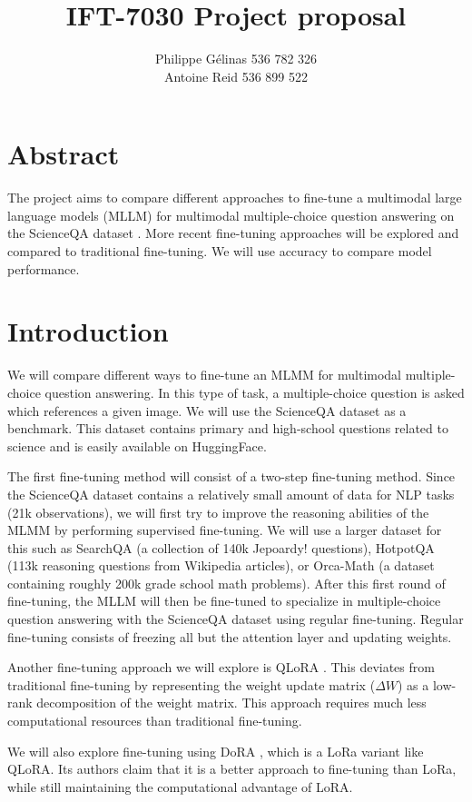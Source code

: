 \documentclass[11pt]{article} %
\title{IFT-7030 Project proposal}
\author{Philippe Gélinas 536 782 326 \\ Antoine Reid 536 899 522}
\date{\vspace{-5ex}} %
\begin{document}
\maketitle

\section*{Abstract}
The project aims to compare different approaches to fine-tune a multimodal large language models (MLLM) for multimodal multiple-choice question answering on the ScienceQA dataset \cite{ScienceQA}. More recent fine-tuning approaches will be explored and compared to traditional fine-tuning. We will use accuracy to compare model performance.

\section*{Introduction}
We will compare different ways to fine-tune an MLMM for multimodal multiple-choice question answering. In this type of task, a multiple-choice question is asked which references a given image. We will use the ScienceQA dataset as a benchmark. This dataset contains primary and high-school questions related to science and is easily available on HuggingFace.

The first fine-tuning method will consist of a two-step fine-tuning method. Since the ScienceQA dataset contains a relatively small amount of data for NLP tasks (21k observations), we will first try to improve the reasoning abilities of the MLMM by performing supervised fine-tuning. We will use a larger dataset for this such as SearchQA (a collection of 140k Jepoardy! questions), HotpotQA (113k reasoning questions from Wikipedia articles), or Orca-Math (a dataset containing roughly 200k grade school math problems). After this first round of fine-tuning, the MLLM will then be fine-tuned to specialize in multiple-choice question answering with the ScienceQA dataset using regular fine-tuning. Regular fine-tuning consists of freezing all but the attention layer and updating weights.

Another fine-tuning approach we will explore is QLoRA \cite{qlora}. This deviates from traditional fine-tuning by representing the weight update matrix ($\Delta W$) as a low-rank decomposition of the weight matrix. This approach requires much less computational resources than traditional fine-tuning.

We will also explore fine-tuning using DoRA \cite{dora}, which is a LoRa \cite{lora} variant like QLoRA. Its authors claim that it is a better approach to fine-tuning than LoRa, while still maintaining the computational advantage of LoRA.
\end{document}

